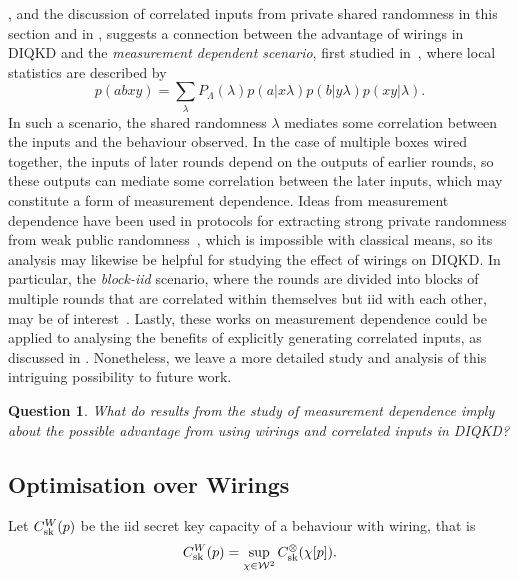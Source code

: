 \documentclass[10pt, a4paper]{article}
\numberwithin{equation}{section} %
\theoremstyle{definition}
\theoremstyle{plain}
\newtheorem{question}{Question}
\newcommand{\?}{\mathrel{?}} %
\newcommand{\sW}{\mathcal{W}}
\newcommand{\sk}{\rm sk}
\begin{document}
    , and the discussion of correlated inputs from private shared randomness in this section and in , suggests a connection between the advantage of wirings in DIQKD and the \emph{measurement dependent scenario}, first studied in~\cite{RelaxedBell}, where local statistics are described by~\cite[Eq. 2]{MDLBeyondIID}
              \begin{equation}
                p(abxy) = \sum_{\lambda} P_{\Lambda}(\lambda) p(a|x\lambda) p(b|y\lambda) p(xy|\lambda).
              \end{equation}
              In such a scenario, the shared randomness \(\lambda\) mediates some correlation between the inputs and the behaviour observed. In the case of multiple boxes wired together, the inputs of later rounds depend on the outputs of earlier rounds, so these outputs can mediate some correlation between the later inputs, which may constitute a form of measurement dependence. Ideas from measurement dependence have been used in protocols for extracting strong private randomness from weak public randomness~\cite{DIRA}, which is impossible with classical means, so its analysis may likewise be helpful for studying the effect of wirings on DIQKD\@. In particular, the  \emph{block-iid} scenario, where the rounds are divided into blocks of multiple rounds that are correlated within themselves but iid with each other, may be of interest~\cite{MDLBeyondIID}. Lastly, these works on measurement dependence could be applied to analysing the benefits of explicitly generating correlated inputs, as discussed in . Nonetheless, we leave a more detailed study and analysis of this intriguing possibility to future work.
              \begin{question}
                What do results from the study of measurement dependence imply about the possible advantage from using wirings and correlated inputs in DIQKD\@?
              \end{question}

              \subsection{Optimisation over Wirings}\label{sec:krwir_wiropt}


                  Let \(C^{W}_{\sk}(p)\) be the iid secret key capacity of a behaviour with wiring, that is
                  \begin{equation}
                    C^{W}_{\sk}(p) = \sup_{\chi\in\sW^2} C^{\otimes}_{\sk}(\chi[p]).
                  \end{equation}
\end{document}
